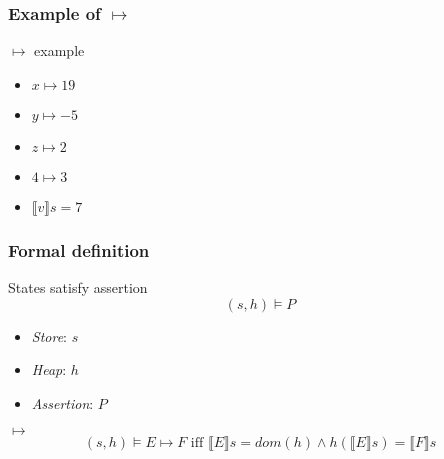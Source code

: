 \documentclass{beamer}
\begin{document}
	\begin{frame}[fragile]
	\frametitle{Example of $\mapsto$}
	\begin{exampleblock}{$\mapsto$ example}
	\begin{minipage}{0.5\textwidth}
	\begin{center}
	\end{center}
	\end{minipage}\noindent
	\begin{minipage}{0.5\textwidth}
		\begin{itemize}
			\item $x\mapsto 19$
			\item $y\mapsto -5$
			\item $z\mapsto 2$
			\item $4\mapsto 3$
			\item $\llbracket v\rrbracket s = 7$
		\end{itemize}
	\end{minipage}
	\end{exampleblock}
	\end{frame}

	\begin{frame}
	\frametitle{Formal definition}
	\begin{block}{States satisfy assertion}
		$$(s,h)\models P$$
		\vspace{-0.7cm}
		\begin{itemize}
			\item \emph{Store}: $s$
			\item \emph{Heap}: $h$
			\item \emph{Assertion}: $P$
		\end{itemize}
	\end{block}
	\begin{block}{$\mapsto$}
		$$(s,h)\models E\mapsto F\text{ iff }\llbracket E\rrbracket s=\textit{dom}(h)\land h(\llbracket E\rrbracket s) = \llbracket F\rrbracket s$$
	\end{block}
	\end{frame}
\end{document}
